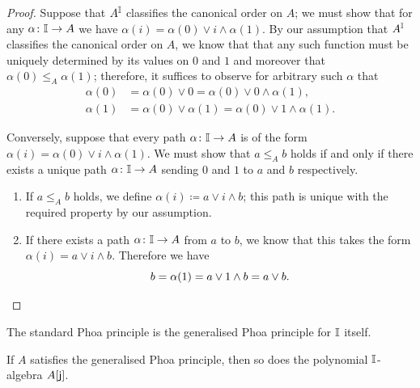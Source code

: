 \begin{proof}
  Suppose that $A^{\mathbb{I}}$ classifies the canonical order on $A$; we must show that for any $\alpha\colon \mathbb{I}\to A$ we have $\alpha(i) = \alpha(0)\vee i \wedge \alpha(1)$. By our assumption that $A^{\mathbb{I}}$ classifies the canonical order on $A$, we know that that any such function must be uniquely determined by its values on $0$ and $1$ and moreover that $\alpha(0) \le_A \alpha(1)$; therefore, it suffices to observe for arbitrary such $\alpha$ that
  \begin{align*}
    \alpha(0) &= \alpha(0) \vee 0 = \alpha(0)\vee 0 \wedge \alpha(1)\text{,}\\
    \alpha(1) &= \alpha(0)\vee\alpha(1) = \alpha(0)\vee 1 \wedge \alpha(1)\text{.}
  \end{align*}

  Conversely, suppose that every path $\alpha\colon \mathbb{I}\to A$ is of the form $\alpha(i) = \alpha(0)\vee i \wedge \alpha(1)$. We must show that $a\le_A b$ holds if and only if there exists a unique path $\alpha\colon \mathbb{I}\to A$ sending $0$ and $1$ to $a$ and $b$ respectively.
  \begin{enumerate}
    \item If $a\le_A b$ holds, we define $\alpha(i) \coloneq a\vee i \wedge b$; this path is unique with the required property by our assumption. 
    \item If there exists a path $\alpha\colon\mathbb{I}\to A$ from $a$ to $b$, we know that this takes the form $\alpha(i) = a \vee i \wedge b$. Therefore we have
    \[ 
      b = \alpha(1) = a\vee 1\wedge b = a \vee b.
      \qedhere
    \] 
  \end{enumerate}
\end{proof}

The standard Phoa principle is the generalised Phoa principle for $\mathbb{I}$ itself.

\begin{theorem}\label{thm:gen-phoa-poly}
  If $A$ satisfies the generalised Phoa principle, then so does the polynomial $\mathbb{I}$-algebra $A[\mathsf{j}]$.
\end{theorem}

